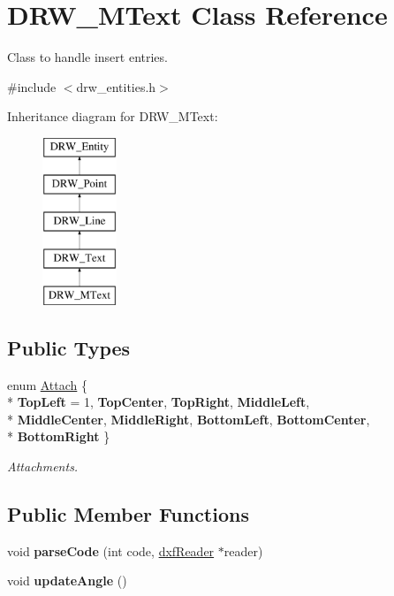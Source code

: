 \hypertarget{classDRW__MText}{\section{D\-R\-W\-\_\-\-M\-Text Class Reference}
\label{classDRW__MText}
}


Class to handle insert entries.  




{\ttfamily \#include $<$drw\-\_\-entities.\-h$>$}

Inheritance diagram for D\-R\-W\-\_\-\-M\-Text\-:\begin{figure}[H]
\begin{center}
\leavevmode
\includegraphics[height=5.000000cm]{classDRW__MText}
\end{center}
\end{figure}
\subsection*{Public Types}
\begin{DoxyCompactItemize}
\item 
enum \hyperlink{classDRW__MText_a19eb89e577ee3e259f52bc7aebf7b84c}{Attach} \{ \\*
{\bfseries Top\-Left} = 1, 
{\bfseries Top\-Center}, 
{\bfseries Top\-Right}, 
{\bfseries Middle\-Left}, 
\\*
{\bfseries Middle\-Center}, 
{\bfseries Middle\-Right}, 
{\bfseries Bottom\-Left}, 
{\bfseries Bottom\-Center}, 
\\*
{\bfseries Bottom\-Right}
 \}
\begin{DoxyCompactList}\small\item\em Attachments. \end{DoxyCompactList}\end{DoxyCompactItemize}
\subsection*{Public Member Functions}
\begin{DoxyCompactItemize}
\item 
\hypertarget{classDRW__MText_af1a6f9785a485940b04fd95d47500557}{void {\bfseries parse\-Code} (int code, \hyperlink{classdxfReader}{dxf\-Reader} $\ast$reader)}\label{classDRW__MText_af1a6f9785a485940b04fd95d47500557}

\item 
\hypertarget{classDRW__MText_a711ecd5da1dbe6ce102db2e678d6d89c}{void {\bfseries update\-Angle} ()}\label{classDRW__MText_a711ecd5da1dbe6ce102db2e678d6d89c}

\end{DoxyCompactItemize}
